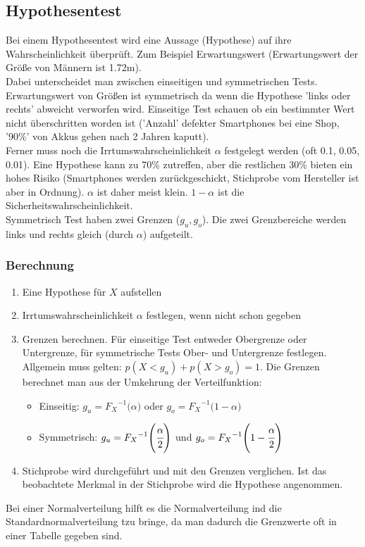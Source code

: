 \documentclass[a4paper]{scrartcl}
\begin{document}
        \subsection{Hypothesentest}
            Bei einem Hypothesentest wird eine Aussage (Hypothese) auf ihre Wahrscheinlichkeit überprüft. Zum Beispiel Erwartungswert (Erwartungswert der Größe von Männern ist 1.72m). \\
            Dabei unterscheidet man zwischen einseitigen und symmetrischen Tests. Erwartungswert von Größen ist symmetrisch da wenn die Hypothese 'links oder rechts' abweicht verworfen wird.
            Einseitige Test schauen ob ein bestimmter Wert nicht überschritten worden ist ('Anzahl' defekter Smartphones bei eine Shop, '90\%' von Akkus gehen nach 2 Jahren kaputt). \\
            Ferner muss noch die Irrtumswahrscheinlichkeit \(\alpha\) festgelegt werden (oft 0.1, 0.05, 0.01). Eine Hypothese kann zu 70\% zutreffen, aber die restlichen 30\% bieten ein hohes 
            Risiko (Smartphones werden zurückgeschickt, Stichprobe vom Hersteller ist aber in Ordnung). \(\alpha\) ist daher meist klein. \(1 - \alpha\) ist die Sicherheitswahrscheinlichkeit. \\
            Symmetrisch Test haben zwei Grenzen (\(g_u, g_o\)). Die zwei Grenzbereiche werden links und rechts gleich (durch \(\alpha\)) aufgeteilt.
            \subsubsection*{Berechnung}
            \begin{enumerate}
                \item Eine Hypothese für \(X\) aufstellen
                \item Irrtumswahrscheinlichkeit \(\alpha\) festlegen, wenn nicht schon gegeben
                \item Grenzen berechnen. Für einseitige Test entweder Obergrenze oder Untergrenze, für symmetrische Tests Ober- und Untergrenze festlegen. 
                      Allgemein muss gelten: \(p(X < g_u) + p(X > g_o) = 1 \). Die Grenzen berechnet man aus der Umkehrung der Verteilfunktion:
                      \begin{itemize}
                          \item Einseitig: \(g_u = {F_X}^{-1} \Bigg( \alpha \Bigg) \) oder \(g_o = {F_X}^{-1} \Bigg(1 - \alpha \Bigg)\)
                          \item Symmetrisch: \(g_u = {F_X}^{-1} \Bigg( \cfrac{\alpha}{2} \Bigg) \) und \(g_o = {F_X}^{-1} \Bigg(1 - \cfrac{\alpha}{2} \Bigg) \)
                      \end{itemize} 
                \item Stichprobe wird durchgeführt und mit den Grenzen verglichen. Ist das beobachtete Merkmal in der Stichprobe wird die Hypothese angenommen. 
            \end{enumerate}   
            Bei einer Normalverteilung hilft es die Normalverteilung ind die Standardnormalverteilung tzu bringe, da man dadurch die Grenzwerte oft in einer Tabelle gegeben sind.
\end{document}
